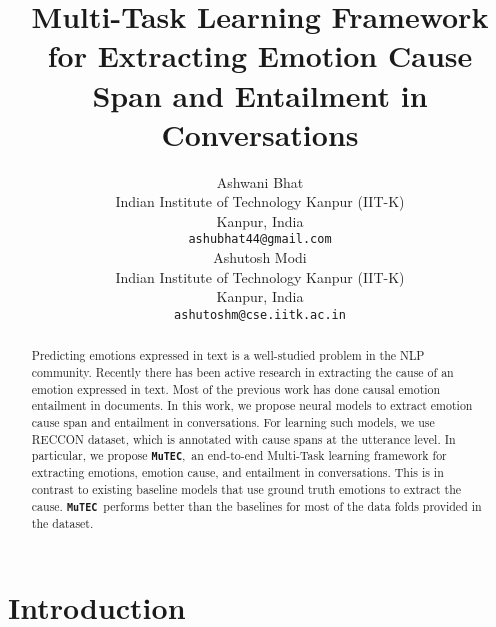 \documentclass{article}
\title{Multi-Task Learning Framework for Extracting Emotion Cause Span and Entailment in Conversations}
\author{
Ashwani Bhat \\
Indian Institute of Technology Kanpur (IIT-K) \\
Kanpur, India \\
\texttt{ashubhat44@gmail.com} \\
\And
Ashutosh Modi \\
Indian Institute of Technology Kanpur (IIT-K) \\
Kanpur, India \\
\texttt{ashutoshm@cse.iitk.ac.in} \\
}
\newcommand{\modelname}{\textbf{\texttt{MuTEC}}}
\begin{document}
\maketitle

\begin{abstract}
Predicting emotions expressed in text is a well-studied problem in the NLP community. Recently there has been active research in extracting the cause of an emotion expressed in text. Most of the previous work has done causal emotion entailment in documents. In this work, we propose neural models to extract emotion cause span and entailment in conversations. For learning such models, we use RECCON dataset, which is annotated with cause spans at the utterance level. In particular, we propose \modelname,\ an end-to-end Multi-Task learning framework for extracting emotions, emotion cause, and entailment in conversations. This is in contrast to existing baseline models that use ground truth emotions to extract the cause. \modelname\ performs better than the baselines for most of the data folds provided in the dataset.
\end{abstract}

%
 \section{Introduction}
\vspace{-3mm}
\end{document}

